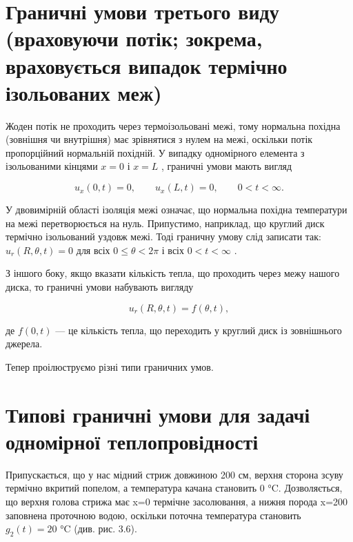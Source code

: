 \documentclass[
  ukrainian,
]{article}
\begin{document}
\section{Граничні умови третього виду (враховуючи потік; зокрема,
враховується випадок термічно ізольованих
меж)}\label{ux433ux440ux430ux43dux438ux447ux43dux456-ux443ux43cux43eux432ux438-ux442ux440ux435ux442ux44cux43eux433ux43e-ux432ux438ux434ux443-ux432ux440ux430ux445ux43eux432ux443ux44eux447ux438-ux43fux43eux442ux456ux43a-ux437ux43eux43aux440ux435ux43cux430-ux432ux440ux430ux445ux43eux432ux443ux454ux442ux44cux441ux44f-ux432ux438ux43fux430ux434ux43eux43a-ux442ux435ux440ux43cux456ux447ux43dux43e-ux456ux437ux43eux43bux44cux43eux432ux430ux43dux438ux445-ux43cux435ux436}

Жоден потік не проходить через термоізольовані межі, тому нормальна
похідна (зовнішня чи внутрішня) має зрівнятися з нулем на межі, оскільки
потік пропорційний нормальній похідній. У випадку одномірного елемента з
ізольованими кінцями \(x=0\) і \(x=L\) , граничні умови мають вигляд

\[
u_x(0, t) = 0, \qquad u_x(L, t) = 0, \qquad 0 < t < \infty.
\]

У двовимірній області ізоляція межі означає, що нормальна похідна
температури на межі перетворюється на нуль. Припустимо, наприклад, що
круглий диск термічно ізольований уздовж межі. Тоді граничну умову слід
записати так: \(u_r(R, \theta, t) = 0\) для всіх \(0 \le \theta < 2\pi\)
і всіх \(0 < t < \infty\) .

З іншого боку, якщо вказати кількість тепла, що проходить через межу
нашого диска, то граничні умови набувають вигляду

\[
u_r(R, \theta, t) = f(\theta, t),
\]

де \(f(0, t)\) --- це кількість тепла, що переходить у круглий диск із
зовнішнього джерела.

Тепер проілюструємо різні типи граничних умов.

\section{Типові граничні умови для задачі одномірної
теплопровідності}\label{ux442ux438ux43fux43eux432ux456-ux433ux440ux430ux43dux438ux447ux43dux456-ux443ux43cux43eux432ux438-ux434ux43bux44f-ux437ux430ux434ux430ux447ux456-ux43eux434ux43dux43eux43cux456ux440ux43dux43eux457-ux442ux435ux43fux43bux43eux43fux440ux43eux432ux456ux434ux43dux43eux441ux442ux456}

Припускається, що у нас мідний стриж довжиною 200 см, верхня сторона
зсуву термічно вкритий попелом, а температура качана становить 0 °C.
Дозволяється, що верхня голова стрижа має x=0 термічне засолювання, а
нижня порода x=200 заповнена проточною водою, оскільки поточна
температура становить \(g_2(t)=20\) °C (див. рис. 3.6).
\end{document}
